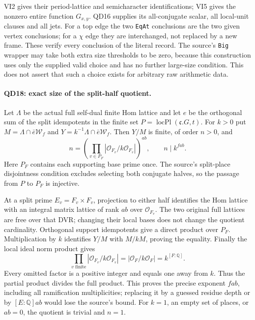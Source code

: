 VI2 gives their period-lattice and semicharacter identifications;
VI5 gives the nonzero entire function $G_{x,y}$.  QD16 supplies
its all-conjugate scalar, all local-unit clauses and all jets.
For a top edge the two \texttt{EqAt} conclusions are the two
given vertex conclusions; for a $\chi$ edge they are interchanged,
not replaced by a new frame.  These verify every conclusion of
the literal record.  The source's \texttt{Big} wrapper may take
both extra size thresholds to be zero, because this construction
uses only the supplied valid choice and has no further large-size
condition.  This does not assert that such a choice exists for
arbitrary raw arithmetic data.

\paragraph{QD18: exact size of the split-half quotient.}
Let $\Lambda$ be the actual full self-dual finite Hom lattice
and let $e$ be the orthogonal sum of the split idempotents in
the finite set $P=\operatorname{locPl}(\mathfrak c.G,t)$.
For $k>0$ put $M=\Lambda\cap\bar e\mathcal W_f$ and
$Y=k^{-1}\Lambda\cap\bar e\mathcal W_f$.  Then $Y/M$ is
finite, of order $n>0$, and
\[
 n=\left(\prod_{v\in P_F}|\mathcal O_{F_v}/k\mathcal O_{F_v}|
                                                \right)^{ab},
                           \qquad n\mid k^{f a b}.        \tag{QD.22}
\]
Here $P_F$ contains each supporting base prime once.  The source's
split-place disjointness condition excludes selecting both
conjugate halves, so the passage from $P$ to $P_F$ is injective.

At a split prime $E_v=F_v\times F_v$, projection to either half
identifies the Hom lattice with an integral matrix lattice of
rank $ab$ over $\mathcal O_{F_v}$.  The two original full
lattices are free over that DVR; changing their local bases
does not change the quotient cardinality.  Orthogonal support
idempotents give a direct product over $P_F$.  Multiplication
by $k$ identifies $Y/M$ with $M/kM$, proving the equality.
Finally the local ideal norm product gives
\[
       \prod_{v\text{ finite}}|\mathcal O_{F_v}/k\mathcal O_{F_v}|
            =|\mathcal O_F/k\mathcal O_F|=k^{[F:\mathbb Q]}.
                                                               \tag{QD.23}
\]
Every omitted factor is a positive integer and equals one away
from $k$.  Thus the partial product divides the full product.
This proves the precise exponent $f a b$, including all
ramification multiplicities; replacing it by a guessed residue
depth or by $[E:\mathbb Q]ab$ would lose the source's bound.
For $k=1$, an empty set of places, or $ab=0$, the quotient is
trivial and $n=1$.

